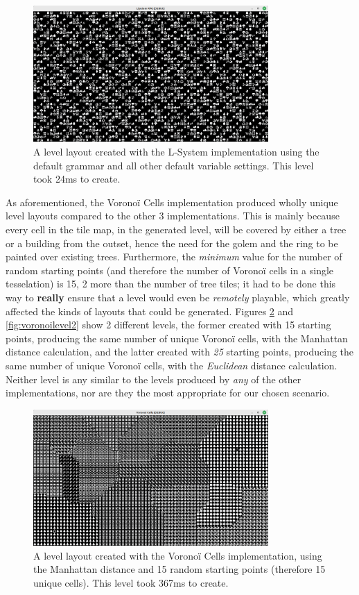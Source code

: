 \begin{figure}[H]
    \centering
    \includegraphics[width=0.8\textwidth]{Images/lsystem2-24ms.png}
    \caption{A level layout created with the L-System implementation using the default grammar and all other default variable settings. This level took 24ms to create.}
    \label{fig:lsys2}
\end{figure}

As aforementioned, the Voronoï Cells implementation produced wholly unique level layouts compared to the other 3 implementations. This is mainly because every cell in the tile map, in the generated level, will be covered by either a tree or a building from the outset, hence the need for the golem and the ring to be painted over existing trees. Furthermore, the \textit{minimum} value for the number of random starting points (and therefore the number of Voronoï cells in a single tesselation) is 15, 2 more than the number of tree tiles; it had to be done this way to \textbf{really} ensure that a level would even be \textit{remotely} playable, which greatly affected the kinds of layouts that could be generated. Figures \ref{fig:voronoilevel1} and \ref{fig:voronoilevel2} show 2 different levels, the former created with 15 starting points, producing the same number of unique Voronoï cells, with the Manhattan distance calculation, and the latter created with \textit{25} starting points, producing the same number of unique Voronoï cells, with the \textit{Euclidean} distance calculation. Neither level is any similar to the levels produced by \textit{any} of the other implementations, nor are they the most appropriate for our chosen scenario. 

\begin{figure}[H]
    \centering
    \includegraphics[width=0.8\textwidth]{Images/voronoi-15-367ms.png}
    \caption{A level layout created with the Voronoï Cells implementation, using the Manhattan distance and 15 random starting points (therefore 15 unique cells). This level took 367ms to create.}
    \label{fig:voronoilevel1}
\end{figure}

